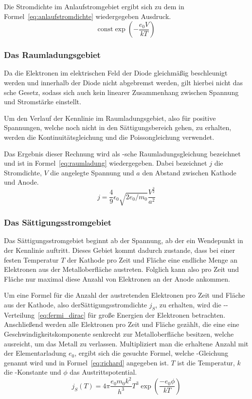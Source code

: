 Die Stromdichte im Anlaufstromgebiet ergibt sich zu dem in
Formel~\eqref{eq:anlaufstromdichte} wiedergegeben Ausdruck.
\begin{equation}
\text{const}\exp{\left(-\frac{e_0V}{kT}\right)}
\label{eq:anlaufstromdichte}
\end{equation}
%
\subsubsection{Das Raumladungsgebiet}
%
Da die Elektronen im elektrischen Feld der Diode gleichmäßig
beschleunigt werden und innerhalb der Diode nicht abgebremst werden,
gilt hierbei nicht das sche Gesetz, sodass sich auch kein
linearer Zusammenhang zwischen Spannung und Stromstärke einstellt.

Um den Verlauf der Kennlinie im Raumladungsgebiet, also für positive
Spannungen, welche noch nicht in den Sättigungsbereich gehen, zu
erhalten, werden die Kontinuitätsgleichung und die Poissongleichung
verwendet.

Das Ergebnis dieser Rechnung wird als
-sche Raumladungsgleichung bezeichnet und
ist in Formel~\eqref{eq:raumladung} wiedergegeben. Dabei bezeichnet $j$
die Stromdichte, $V$ die angelegte Spannung und $a$ den Abstand zwischen
Kathode und Anode.
\begin{equation}
j = \frac{4}{9} \epsilon_0 \sqrt{2e_0/m_0} \frac{V^{\frac{3}{2}}}{a^2}
\label{eq:raumladung}
\end{equation}
%
\subsubsection{Das Sättigungsstromgebiet}
%
Das Sättigungsstromgebiet beginnt ab der Spannung, ab der ein Wendepunkt
in der Kennlinie auftritt. Dieses Gebiet kommt dadurch zustande, dass
bei einer festen Temperatur $T$ der Kathode pro Zeit und Fläche eine
endliche Menge an Elektronen aus der Metalloberfläche
austreten. Folglich kann also pro Zeit und Fläche nur maximal diese
Anzahl von Elektronen an der Anode ankommen.

Um eine Formel für die Anzahl der austretenden Elektronen pro Zeit und
Fläche aus der Kathode, also derSättigungsstromdichte $j_S$, zu
erhalten, wird die
--Verteilung~\eqref{eq:fermi_dirac} für große
Energien der Elektronen betrachten.  Anschließend werden alle Elektronen
pro Zeit und Fläche gezählt, die eine eine Geschwindigkeitskomponente
senkrecht zur Metalloberfläche besitzen, welche ausreicht, um das Metall
zu verlassen. Multipliziert man die erhaltene Anzahl mit der
Elementarladung $e_0$, ergibt sich die gesuchte Formel, welche
-Gleichung genannt wird und in
Formel~\eqref{eq:richard} angegeben ist. $T$ ist die Temperatur, $k$ die
-Konstante und $\phi$ das Austrittspotential.
%
\begin{equation}
j_S(T) = 4\pi\frac{e_0m_0k^2}{h^3}T^3\exp{\left(\frac{-e_0\phi}{kT}\right)}
\label{eq:richard}
\end{equation}
%
